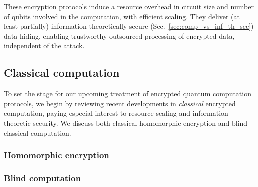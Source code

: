 These encryption protocols induce a resource overhead in circuit size and number of qubits involved in the computation, with efficient scaling. They deliver (at least partially) information-theoretically secure (Sec.~\ref{sec:comp_vs_inf_th_sec}) data-hiding, enabling trustworthy outsourced processing of encrypted data, independent of the attack.

%
%

\subsection{Classical computation} 

To set the stage for our upcoming treatment of encrypted quantum computation protocols, we begin by reviewing recent developments in \textit{classical} encrypted computation, paying especial interest to resource scaling and information-theoretic security. We discuss both classical homomorphic encryption and blind classical computation.





%
%

\subsubsection{Homomorphic encryption} 


%
%

\subsubsection{Blind computation} 


%
%

